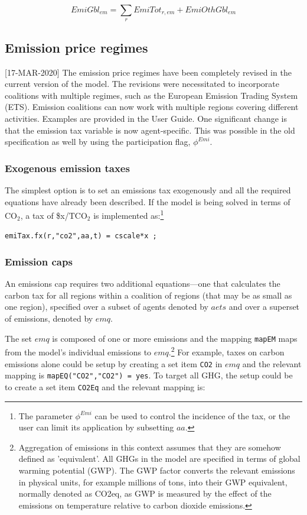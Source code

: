 \documentclass[11pt,letterpaper]{report}
\begin{document}
\begin{equation}
\label{eq:emigbl}
\mathit{EmiGbl}_{\mathit{em}} =
   \displaystyle \sum_{\mathit{r}} {
      \mathit{EmiTot}_{r,\mathit{em}}
   }
   + \mathit{EmiOthGbl}_{\mathit{em}}
\end{equation}

\subsection{Emission price regimes}

[17-MAR-2020] The emission price regimes have been completely revised
in the current version of the model. The revisions were necessitated
to incorporate coalitions with multiple regimes, such
as the European Emission Trading System (ETS). Emission coalitions
can now work with multiple regions covering different activities.
Examples are provided in the User Guide. One significant change
is that the emission tax variable is now agent-specific. This was
possible in the old specification as well by using the participation
flag, $\phi^{\mathit{Emi}}$.

\subsubsection{Exogenous emission taxes}
The simplest option is to set an emissions tax exogenously and all the required
equations have already been described. If the model is
being solved in terms of $\textrm{CO}_2$, a tax of \$x/$\textrm{TCO}_2$ is
implemented as:\footnote{The parameter $\phi^{\mathit{Emi}}$ can be used
to control the incidence of the tax, or the user can limit its application
by subsetting $\mathit{aa}$.}

\medskip
\texttt{emiTax.fx(r,"co2",aa,t) = cscale*x ;}
\medskip

\subsubsection{Emission caps}

An emissions cap requires two additional equations---one that calculates the
carbon tax for all regions within a coalition of regions (that may be as small
as one region), specified over a subset of agents denoted by $\mathit{aets}$
and over a superset of emissions, denoted by $\mathit{emq}$.

The set $\mathit{emq}$ is composed of one or more emissions and the mapping
\texttt{mapEM} maps from the model's individual emissions to
$\mathit{emq}$.\footnote{Aggregation of emissions in this context
assumes that they are somehow defined as 'equivalent'. All GHGs
in the model are specified in terms of global warming potential (GWP).
The GWP factor converts the relevant emissions in physical units,
for example millions of tons, into their GWP equivalent, normally
denoted as CO2eq, as GWP is measured by the effect
of the emissions on temperature relative to carbon dioxide emissions.}
For example, taxes on carbon emissions alone could be setup by
creating a set item \texttt{CO2} in $\mathit{emq}$ and the relevant
mapping is \texttt{mapEQ("CO2","CO2") = yes}. To target all GHG, the
setup could be to create a set item \texttt{CO2Eq} and
the relevant mapping is:
\end{document}
